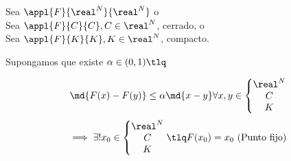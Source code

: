 \documentclass{apuntes}
\begin{document}
\begin{theorem}
Sea $\appl{F}{\real^N}{\real^N}$ o\\
Sea $\appl{F}{C}{C}, C\in \real^N$, cerrado, o\\
Sea $\appl{F}{K}{K}, K\in \real^N$, compacto.

Supongamos que existe $\alpha\in(0,1) \tlq$

$$\md{F(x)-F(y)}\leq \alpha\md{x-y} \forall x,y \in \left\{\begin{matrix}
                                                           \real^N\\
                                                           C\\
                                                           K
                                                          \end{matrix}\right. 
                                              $$
$$\implies \exists ! x_0 \in\left\{\begin{matrix}         \real^N\\
                                                           C\\
                                                           K
                                                          \end{matrix}\right. 
                                                        \tlq F(x_0) = x_0 \text{ (Punto fijo)}$$
\end{theorem}
\end{document}
